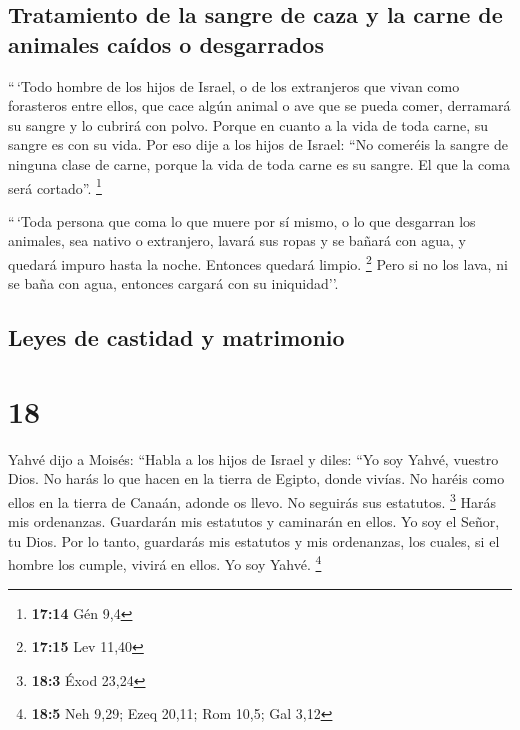 \hypertarget{tratamiento-de-la-sangre-de-caza-y-la-carne-de-animales-cauxeddos-o-desgarrados}{%
\subsection{Tratamiento de la sangre de caza y la carne de animales
caídos o
desgarrados}\label{tratamiento-de-la-sangre-de-caza-y-la-carne-de-animales-cauxeddos-o-desgarrados}}

 ``\,`Todo hombre de los hijos de Israel, o de los
extranjeros que vivan como forasteros entre ellos, que cace algún animal
o ave que se pueda comer, derramará su sangre y lo cubrirá con polvo.
 Porque en cuanto a la vida de toda carne, su sangre es
con su vida. Por eso dije a los hijos de Israel: ``No comeréis la sangre
de ninguna clase de carne, porque la vida de toda carne es su sangre. El
que la coma será cortado''. \footnote{\textbf{17:14} Gén 9,4}

 ``\,`Toda persona que coma lo que muere por sí mismo, o
lo que desgarran los animales, sea nativo o extranjero, lavará sus ropas
y se bañará con agua, y quedará impuro hasta la noche. Entonces quedará
limpio. \footnote{\textbf{17:15} Lev 11,40}  Pero si no
los lava, ni se baña con agua, entonces cargará con su iniquidad''.

\hypertarget{leyes-de-castidad-y-matrimonio}{%
\subsection{Leyes de castidad y
matrimonio}\label{leyes-de-castidad-y-matrimonio}}

\hypertarget{section-17}{%
\section{18}\label{section-17}}

 Yahvé dijo a Moisés:  ``Habla a los hijos
de Israel y diles: ``Yo soy Yahvé, vuestro Dios.  No harás
lo que hacen en la tierra de Egipto, donde vivías. No haréis como ellos
en la tierra de Canaán, adonde os llevo. No seguirás sus estatutos.
\footnote{\textbf{18:3} Éxod 23,24}  Harás mis ordenanzas.
Guardarán mis estatutos y caminarán en ellos. Yo soy el Señor, tu Dios.
 Por lo tanto, guardarás mis estatutos y mis ordenanzas,
los cuales, si el hombre los cumple, vivirá en ellos. Yo soy Yahvé.
\footnote{\textbf{18:5} Neh 9,29; Ezeq 20,11; Rom 10,5; Gal 3,12}


